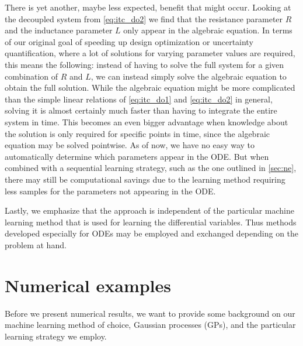 \documentclass[AMA,STIX1COL]{WileyNJD-v2}
\begin{document}
There is yet another, maybe less expected, benefit that might occur. Looking at the decoupled system from \eqref{eq:itc_do2} we find that the resistance parameter $R$ and the inductance parameter $L$ only appear in the algebraic equation. In terms of our original goal of speeding up design optimization or uncertainty quantification, where a lot of solutions for varying parameter values are required, this means the following: instead of having to solve the full system for a given combination of $R$ and $L$, we can instead simply solve the algebraic equation to obtain the full solution. While the algebraic equation might be more complicated than the simple linear relations of \eqref{eq:itc_do1} and \eqref{eq:itc_do2} in general, solving it is almost certainly much faster than having to integrate the entire system in time. This becomes an even bigger advantage when knowledge about the solution is only required for specific points in time, since the algebraic equation may be solved pointwise. As of now, we have no easy way to automatically determine which parameters appear in the ODE. But when combined with a sequential learning strategy, such as the one outlined in \autoref{sec:ne}, there may still be computational savings due to the learning method requiring less samples for the parameters not appearing in the ODE.

Lastly, we emphasize that the approach is independent of the particular machine learning method that is used for learning the differential variables. Thus methods developed especially for ODEs may be employed and exchanged depending on the problem at hand.

\section{Numerical examples}
\label{sec:ne}
Before we present numerical results, we want to provide some background on our machine learning method of choice, Gaussian processes (GPs), and the particular learning strategy we employ.
\end{document}
